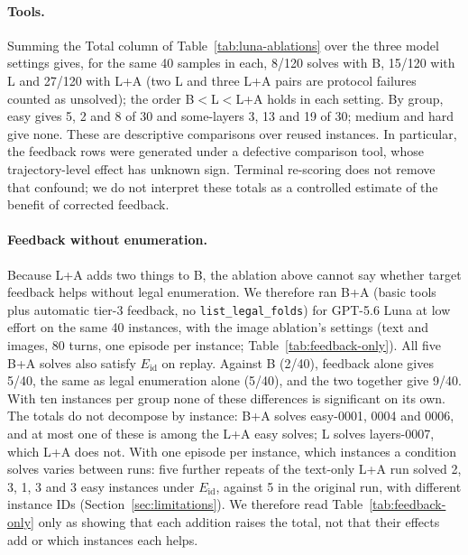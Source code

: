 \paragraph{Tools.} Summing the Total column of Table~\ref{tab:luna-ablations} over the three model
settings gives, for the same 40 samples in each, 8/120 solves with B, 15/120 with L and 27/120
with L+A (two L and three L+A pairs are protocol failures counted as unsolved); the order B$<$L$<$L+A
holds in each setting. By group, easy gives 5, 2 and 8 of 30 and some-layers 3, 13 and 19 of 30;
medium and hard give none. These are descriptive comparisons over reused instances. In particular, the feedback rows
were generated under a defective comparison tool, whose trajectory-level effect has unknown
sign. Terminal re-scoring does not remove that confound; we do not interpret these totals as
a controlled estimate of the benefit of corrected feedback.

\paragraph{Feedback without enumeration.}

Because L+A adds two things to B, the ablation above cannot say whether target feedback helps
without legal enumeration. We therefore ran B+A (basic tools plus automatic tier-3 feedback, no
\texttt{list\_legal\_folds}) for GPT-5.6 Luna at low effort on the same 40 instances, with the
image ablation's settings (text and images, 80 turns, one episode per instance;
Table~\ref{tab:feedback-only}). All five B+A solves also satisfy $E_{\mathrm{id}}$ on replay.
Against B (2/40), feedback alone gives 5/40, the same as legal enumeration alone (5/40), and the
two together give 9/40. With ten instances per group none of these differences is significant on
its own. The totals do not decompose by instance: B+A solves easy-0001, 0004 and 0006, and at most
one of these is among the L+A easy solves; L solves layers-0007, which L+A does not. With one
episode per instance, which instances a condition solves varies between runs: five further repeats of the
text-only L+A run solved 2, 3, 1, 3 and 3 easy instances under $E_{\mathrm{id}}$, against 5 in
the original run, with different instance IDs (Section~\ref{sec:limitations}). We therefore read Table~\ref{tab:feedback-only} only as showing
that each addition raises the total, not that their effects add or which instances each helps.



